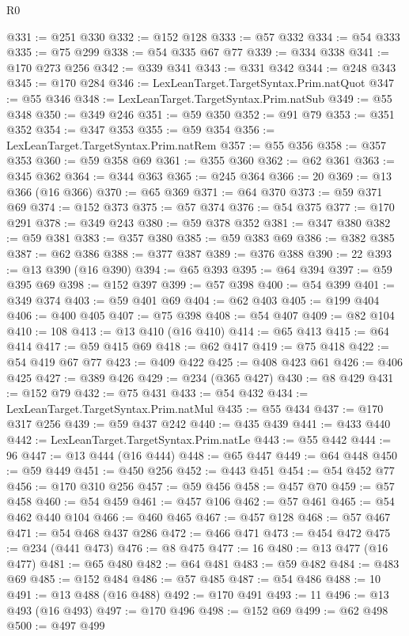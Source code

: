 \begin{lexlean}{R0}
\begin{coremodule}
@331 := @251 @330
@332 := @152 @128
@333 := @57 @332
@334 := @54 @333
@335 := @75 @299
@338 := @54 @335 @67 @77
@339 := @334 @338
@341 := @170 @273 @256
@342 := @339 @341
@343 := @331 @342
@344 := @248 @343
@345 := @170 @284
@346 := LexLeanTarget.TargetSyntax.Prim.natQuot
@347 := @55 @346
@348 := LexLeanTarget.TargetSyntax.Prim.natSub
@349 := @55 @348
@350 := @349 @246
@351 := @59 @350
@352 := @91 @79
@353 := @351 @352
@354 := @347 @353
@355 := @59 @354
@356 := LexLeanTarget.TargetSyntax.Prim.natRem
@357 := @55 @356
@358 := @357 @353
@360 := @59 @358 @69
@361 := @355 @360
@362 := @62 @361
@363 := @345 @362
@364 := @344 @363
@365 := @245 @364
@366 := 20
@369 := @13 @366 (@16 @366)
@370 := @65 @369
@371 := @64 @370
@373 := @59 @371 @69
@374 := @152 @373
@375 := @57 @374
@376 := @54 @375
@377 := @170 @291
@378 := @349 @243
@380 := @59 @378 @352
@381 := @347 @380
@382 := @59 @381
@383 := @357 @380
@385 := @59 @383 @69
@386 := @382 @385
@387 := @62 @386
@388 := @377 @387
@389 := @376 @388
@390 := 22
@393 := @13 @390 (@16 @390)
@394 := @65 @393
@395 := @64 @394
@397 := @59 @395 @69
@398 := @152 @397
@399 := @57 @398
@400 := @54 @399
@401 := @349 @374
@403 := @59 @401 @69
@404 := @62 @403
@405 := @199 @404
@406 := @400 @405
@407 := @75 @398
@408 := @54 @407
@409 := @82 @104
@410 := 108
@413 := @13 @410 (@16 @410)
@414 := @65 @413
@415 := @64 @414
@417 := @59 @415 @69
@418 := @62 @417
@419 := @75 @418
@422 := @54 @419 @67 @77
@423 := @409 @422
@425 := @408 @423 @61
@426 := @406 @425
@427 := @389 @426
@429 := @234 (@365 @427)
@430 := @8 @429
@431 := @152 @79
@432 := @75 @431
@433 := @54 @432
@434 := LexLeanTarget.TargetSyntax.Prim.natMul
@435 := @55 @434
@437 := @170 @317 @256
@439 := @59 @437 @242
@440 := @435 @439
@441 := @433 @440
@442 := LexLeanTarget.TargetSyntax.Prim.natLe
@443 := @55 @442
@444 := 96
@447 := @13 @444 (@16 @444)
@448 := @65 @447
@449 := @64 @448
@450 := @59 @449
@451 := @450 @256
@452 := @443 @451
@454 := @54 @452 @77
@456 := @170 @310 @256
@457 := @59 @456
@458 := @457 @70
@459 := @57 @458
@460 := @54 @459
@461 := @457 @106
@462 := @57 @461
@465 := @54 @462 @440 @104
@466 := @460 @465
@467 := @457 @128
@468 := @57 @467
@471 := @54 @468 @437 @286
@472 := @466 @471
@473 := @454 @472
@475 := @234 (@441 @473)
@476 := @8 @475
@477 := 16
@480 := @13 @477 (@16 @477)
@481 := @65 @480
@482 := @64 @481
@483 := @59 @482
@484 := @483 @69
@485 := @152 @484
@486 := @57 @485
@487 := @54 @486
@488 := 10
@491 := @13 @488 (@16 @488)
@492 := @170 @491
@493 := 11
@496 := @13 @493 (@16 @493)
@497 := @170 @496
@498 := @152 @69
@499 := @62 @498
@500 := @497 @499

\end{coremodule}
\end{lexlean}
